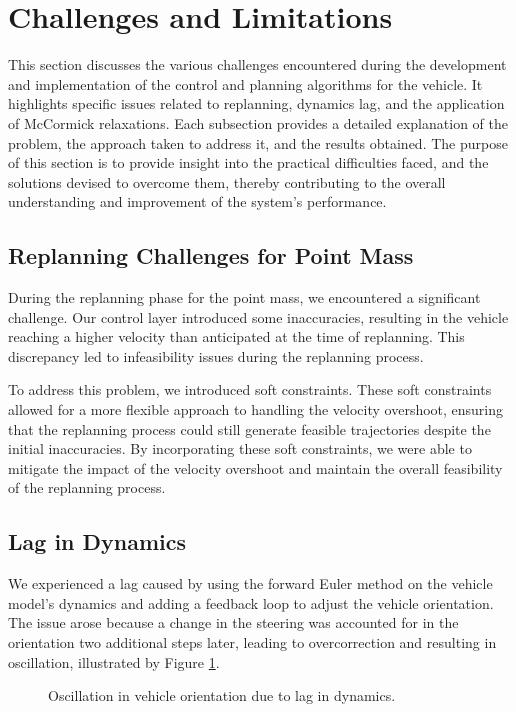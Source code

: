 \section{Challenges and Limitations}

This section discusses the various challenges encountered during the development and implementation of the control and planning algorithms for the
vehicle.
It highlights specific issues related to replanning, dynamics lag, and the application of McCormick relaxations.
Each subsection provides a detailed explanation of the problem, the approach taken to address it, and the results obtained.
The purpose of this section is to provide insight into the practical difficulties faced, and the solutions devised to overcome them, thereby
contributing to the overall understanding and improvement of the system's performance.

\subsection{Replanning Challenges for Point Mass}

During the replanning phase for the point mass, we encountered a significant challenge.
Our control layer introduced some inaccuracies, resulting in the vehicle reaching a higher velocity than anticipated at the time of replanning.
This discrepancy led to infeasibility issues during the replanning process.

To address this problem, we introduced soft constraints.
These soft constraints allowed for a more flexible approach to handling the velocity overshoot, ensuring that the replanning process could still
generate feasible trajectories despite the initial inaccuracies.
By incorporating these soft constraints, we were able to mitigate the impact of the velocity overshoot and maintain the overall feasibility of the
replanning process.
\pagebreak
\subsection{Lag in Dynamics}
We experienced a lag caused by using the forward Euler method on the vehicle model's dynamics and adding a feedback loop to adjust the vehicle
orientation.
The issue arose because a change in the steering was accounted for in the orientation two additional steps later, leading to overcorrection and
resulting in oscillation, illustrated by Figure \ref{fig:lag_orientation}.

\begin{figure}[h]
	\centering
	\resizebox{0.5\textwidth}{!}{}
	\caption{Oscillation in vehicle orientation due to lag in dynamics.}
	\label{fig:lag_orientation}
\end{figure}

